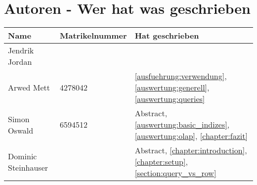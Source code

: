 \chapter{Autoren - Wer hat was geschrieben}
\begin{table}[H]
	\centering
	\begin{tabularx}{\textwidth}{llX}
		\toprule
		Name                &	Matrikelnummer  & Hat geschrieben \\
		\toprule
		Jendrik Jordan      &                   & \\
		Arwed Mett          &   4278042         & \autoref{ausfuehrung:verwendung}, \autoref{auswertung:generell}, \autoref{auswertung:queries} \\
		Simon Oswald        &   6594512         & Abstract, \autoref{auswertung:basic_indizes}, \autoref{auswertung:olap}, \autoref{chapter:fazit} \\
		Dominic Steinhauser &                   & Abstract, \autoref{chapter:introduction}, \autoref{chapter:setup}, \autoref{section:query_vs_row} \\
		\bottomrule
	\end{tabularx}
	\label{tab:autoren}
\end{table}

